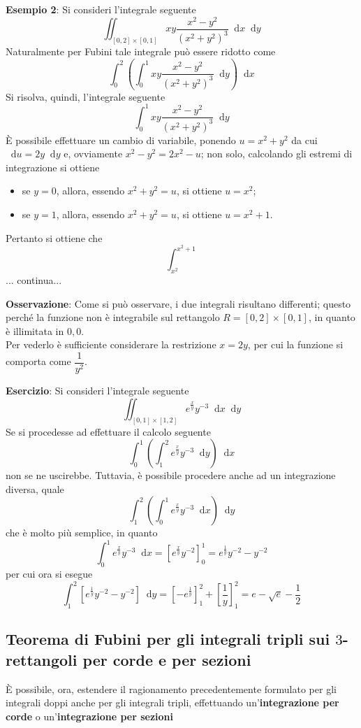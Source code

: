 \documentclass[a4paper]{extarticle}
\newcommand*\dif{\mathop{}\!\mathrm{d}}
\begin{document}
\vspace{2em}
\noindent
\textbf{Esempio 2}: Si consideri l'integrale seguente
\[\iint_{\left[0,2\right] \times \left[0,1\right]} xy \dfrac{x^2-y^2}{(x^2+y^2)^3} \dif x \dif y\]
Naturalmente per Fubini tale integrale può essere ridotto come
\[\int_0^2 \left(\int_0^1 xy \dfrac{x^2-y^2}{(x^2+y^2)^3} \dif y\right) \dif x\]
Si risolva, quindi, l'integrale seguente
\[\int_0^1 xy \dfrac{x^2-y^2}{(x^2+y^2)^3} \dif y\]
È possibile effettuare un cambio di variabile, ponendo $u=x^2+y^2$ da cui $\dif u = 2y \dif y$ e, ovviamente $x^2-y^2=2x^2-u$; non solo, calcolando gli estremi di integrazione si ottiene
\begin{itemize}
    \item se $y=0$, allora, essendo $x^2+y^2=u$, si ottiene $u=x^2$;
    \item se $y=1$, allora, essendo $x^2+y^2=u$, si ottiene $u=x^2+1$.
\end{itemize}
Pertanto si ottiene che
\[\int_{x^2}^{x^2+1}\]
 ... continua...

\vspace{2em}
\noindent
\textbf{Osservazione}: Come si può osservare, i due integrali risultano differenti; questo perché la funzione non è integrabile sul rettangolo $R=[0,2] \times [0,1]$, in quanto è illimitata in $0,0$.\\
Per vederlo è sufficiente considerare la restrizione $x=2y$, per cui la funzione si comporta come $\dfrac{1}{y^2}$.

\vspace{2em}
\noindent
\textbf{Esercizio}: Si consideri l'integrale seguente
\[\iint_{[0,1]\times[1,2]} e^{\frac{x}{y}} y^{-3} \dif x \dif y\]
Se si procedesse ad effettuare il calcolo seguente
\[\int_0^1 \left(\int_1^2 e^{\frac{x}{y}} y^{-3} \dif y\right) \dif x\]
non se ne uscirebbe. Tuttavia, è possibile procedere anche ad un integrazione diversa, quale
\[\int_1^2 \left(\int_0^1 e^{\frac{x}{y}} y^{-3} \dif x\right) \dif y\]
che è molto più semplice, in quanto
\[\int_0^1 e^{\frac{x}{y}} y^{-3} \dif x = \left[e^{\frac{x}{y}} y^{-2}\right]_0^1 = e^{\frac{1}{y}} y^{-2} - y^{-2}\]
per cui ora si esegue
\[\int_1^2 \left[e^{\frac{1}{y}} y^{-2} - y^{-2}\right] \dif y = \left[-e^{\frac{1}{y}}\right]_1^2 + \left[\dfrac{1}{y}\right]_1^2 = e-\sqrt{e} -\dfrac{1}{2}\]

\vspace{1em}
\subsection{Teorema di Fubini per gli integrali tripli sui $3$-rettangoli per corde e per sezioni}
È possibile, ora, estendere il ragionamento precedentemente formulato per gli integrali doppi anche per gli integrali tripli, effettuando un'\textbf{integrazione per corde} o un'\textbf{integrazione per sezioni}
\end{document}
